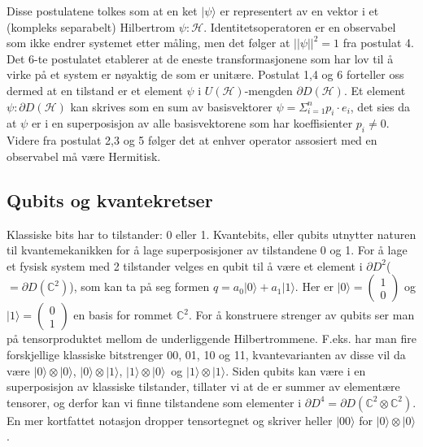         Disse postulatene tolkes som at en ket $|\psi\rangle$ er representert av en vektor i et (kompleks separabelt) Hilbertrom $\psi :\mathcal{H}$. Identitetsoperatoren er en observabel som ikke endrer systemet etter måling, men det følger at $||\psi||^2 = 1$ fra postulat 4. Det 6-te postulatet etablerer at de eneste transformasjonene som har lov til å virke på et system er nøyaktig de som er unitære. Postulat 1,4 og 6 forteller oss dermed at en tilstand er et element $\psi$ i $U(\mathcal{H})$-mengden $\partial D(\mathcal{H})$. Et element $\psi:\partial D(\mathcal{H})$ kan skrives som en sum av basisvektorer $\psi = \Sigma_{i=1}^{n}p_i\cdot e_i$, det sies da at $\psi$ er i en superposisjon av alle basisvektorene som har koeffisienter $p_i \neq 0$. Videre fra postulat 2,3 og 5 følger det at enhver operator assosiert med en observabel må være Hermitisk.


\subsection{Qubits og kvantekretser}
    
        Klassiske bits har to tilstander: 0 eller 1. Kvantebits, eller qubits utnytter naturen til kvantemekanikken for å lage superposisjoner av tilstandene 0 og 1. For å lage et fysisk system med 2 tilstander velges en qubit til å være et element i $\partial D^2$($=\partial D(\mathbb{C}^2)$), som kan ta på seg formen $q = a_0|0\rangle + a_1|1\rangle$. Her er $|0\rangle = \begin{pmatrix}
            1 \\ 0
        \end{pmatrix}$ og $|1\rangle=\begin{pmatrix}
                0 \\ 1
        \end{pmatrix}$ en basis for rommet $\mathbb{C}^2$. For å konstruere strenger av qubits ser man på tensorproduktet mellom de underliggende Hilbertrommene. F.eks. har man fire forskjellige klassiske bitstrenger 00, 01, 10 og 11, kvantevarianten av disse vil da være $|0\rangle \otimes |0\rangle$, $|0\rangle\otimes|1\rangle$, $|1\rangle\otimes |0\rangle$ og $|1\rangle\otimes |1\rangle$. Siden qubits kan være i en superposisjon av klassiske tilstander, tillater vi at de er summer av elementære tensorer, og derfor kan vi finne tilstandene som elementer i $\partial D^4 = \partial D(\mathbb{C}^2 \otimes \mathbb{C}^2)$. En mer kortfattet notasjon dropper tensortegnet og skriver heller $|00\rangle$ for $|0\rangle\otimes |0\rangle$. 

